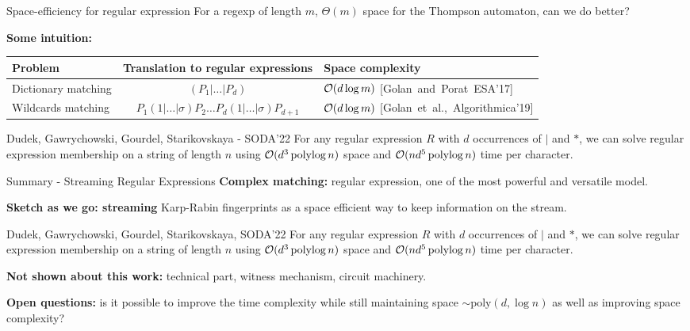 {\renewcommand{\arraystretch}{2}
\begin{frame}{Space-efficiency for regular expression}
    For a regexp of length $m$, $\Theta(m)$ space for the Thompson automaton, can we do better? \pause

    \medskip
    \textbf{Some intuition:}  \pause

    \medskip
    \begin{tabular}{l c p{}}
        Problem & Translation to regular expressions & Space complexity\\ 
        \hline \pause
        Dictionary matching & $(P_{1}|\ldots | P_{d})$ & $\mathcal{O}(d\log m)$  \mbox{\footnotesize [Golan~and~Porat~ESA'17]}\\ \pause
        Wildcards matching & $P_{1}(1|\ldots|\sigma)P_{2}\ldots P_{d}(1|\ldots|\sigma)P_{d+1}$ & $\mathcal{O}(d\log m)$ \mbox{\footnotesize [Golan et al.,~Algorithmica'19]} \pause
    \end{tabular}

    \medskip
    \begin{myalertblock}{Dudek, Gawrychowski, Gourdel, Starikovskaya - SODA'22}
        For any regular expression $R$ with $d$ occurrences of $|$ and $\ast$, we can solve regular expression membership on a string of length $n$ using $\mathcal{O}(d^{3}\operatorname{polylog} n)$ space and $\mathcal{O}(nd^{5}\operatorname{polylog} n)$ time per character.
    \end{myalertblock}
\end{frame}
}

\begin{frame}{Summary - Streaming Regular Expressions}
    \textbf{Complex matching:} regular expression, one of the most powerful and versatile model.

    \vfill
    
    \textbf{Sketch as we go: streaming} Karp-Rabin fingerprints as a space efficient way to keep information on the stream.

    \begin{myalertblock}{Dudek, Gawrychowski, Gourdel, Starikovskaya, SODA'22}
        For any regular expression $R$ with $d$ occurrences of $|$ and $\ast$, we can solve regular expression membership on a string of length $n$ using $\mathcal{O}(d^{3}\operatorname{polylog} n)$ space and $\mathcal{O}(nd^{5}\operatorname{polylog} n)$ time per character.
    \end{myalertblock}
    \vfill
    \textbf{Not shown about this work:} technical part, witness mechanism, circuit machinery.

    \smallskip
    \textbf{Open questions:} is it possible to improve the time complexity while still maintaining space $\sim \mathrm{poly}(d,\log n)$ as well as improving space complexity?
\end{frame}